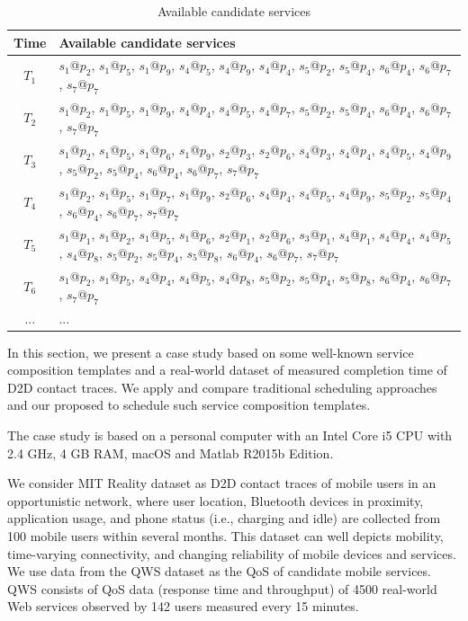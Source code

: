 \documentclass[journal]{IEEEtran}
\begin{document}
\begin{table}[!t]
\renewcommand{\arraystretch}{1.5}
\caption{Available candidate services}
\label{Available candidate services}
\centering
\begin{tabular}{c l}
\hline
\bfseries Time & \bfseries Available candidate services\\
\hline
$T_1$     & $s_1$@$p_2$, $s_1$@$p_5$, $s_1$@$p_9$, $s_4$@$p_5$, $s_4$@$p_9$, $s_4$@$p_4$, $s_5$@$p_2$, $s_5$@$p_4$, $s_6$@$p_4$, $s_6$@$p_7$, $s_7$@$p_7$ \\
$T_2$     & $s_1$@$p_2$, $s_1$@$p_5$, $s_1$@$p_9$, $s_4$@$p_4$, $s_4$@$p_5$, $s_4$@$p_7$, $s_5$@$p_2$, $s_5$@$p_4$, $s_6$@$p_4$, $s_6$@$p_7$, $s_7$@$p_7$ \\
$T_3$     & $s_1$@$p_2$, $s_1$@$p_5$, $s_1$@$p_6$, $s_1$@$p_9$, $s_2$@$p_3$, $s_2$@$p_6$, $s_4$@$p_3$, $s_4$@$p_4$, $s_4$@$p_5$, $s_4$@$p_9$, $s_5$@$p_2$, $s_5$@$p_4$, $s_6$@$p_4$, $s_6$@$p_7$, $s_7$@$p_7$ \\
$T_4$     & $s_1$@$p_2$, $s_1$@$p_5$, $s_1$@$p_7$, $s_1$@$p_9$, $s_2$@$p_6$, $s_4$@$p_4$, $s_4$@$p_5$, $s_4$@$p_9$, $s_5$@$p_2$, $s_5$@$p_4$, $s_6$@$p_4$, $s_6$@$p_7$, $s_7$@$p_7$ \\
$T_5$     & $s_1$@$p_1$, $s_1$@$p_2$, $s_1$@$p_5$, $s_1$@$p_6$, $s_2$@$p_1$, $s_2$@$p_6$, $s_3$@$p_1$, $s_4$@$p_1$, $s_4$@$p_4$, $s_4$@$p_5$, $s_4$@$p_8$, $s_5$@$p_2$, $s_5$@$p_4$, $s_5$@$p_8$, $s_6$@$p_4$, $s_6$@$p_7$, $s_7$@$p_7$ \\
$T_6$     & $s_1$@$p_2$, $s_1$@$p_5$, $s_4$@$p_4$, $s_4$@$p_5$, $s_4$@$p_8$, $s_5$@$p_2$, $s_5$@$p_4$, $s_5$@$p_8$, $s_6$@$p_4$, $s_6$@$p_7$, $s_7$@$p_7$ \\
... & ...\\
\hline
\end{tabular}
\end{table}


In this section, we present a case study based on some well-known service composition templates and a real-world dataset of measured completion time of D2D contact traces. We apply and compare traditional scheduling approaches and our proposed to schedule such service composition templates.

The case study is based on a personal computer with an Intel Core i5 CPU with 2.4 GHz, 4 GB RAM, macOS and Matlab R2015b Edition.

We consider MIT Reality dataset \cite{eagle2006reality} as D2D contact traces of mobile users in an opportunistic network, where user location, Bluetooth devices in proximity, application usage, and phone status (i.e., charging and idle) are collected from 100 mobile users within several months. This dataset can well depicts mobility, time-varying connectivity, and changing reliability of mobile devices and services. 
We use data from the QWS dataset \cite{zheng2014investigating} as the QoS of candidate mobile services. 
QWS consists of QoS data (response time and throughput) of 4500 real-world Web services observed by 142 users measured every 15 minutes.
\end{document}
